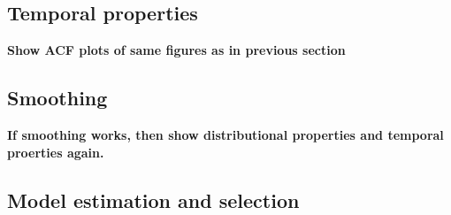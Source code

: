 \subsection{Temporal properties}

\textbf{Show ACF plots of same figures as in previous section}

\subsection{Smoothing}

\textbf{If smoothing works, then show distributional properties and temporal proerties again.}

\subsection{Model estimation and selection}
\label{Subsection: Model estimation and selection}

 